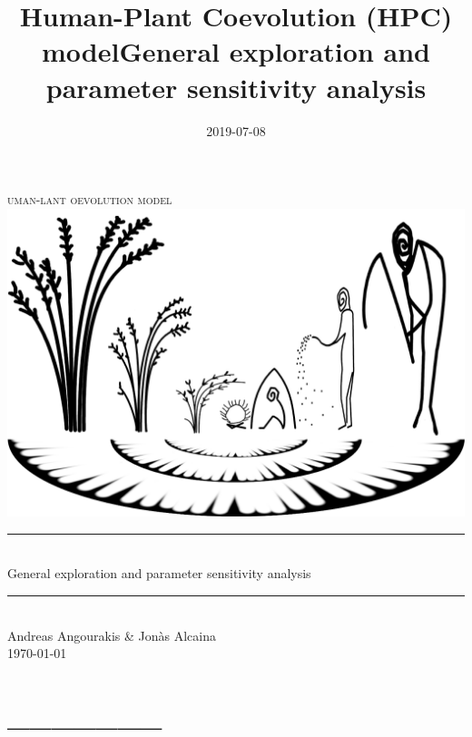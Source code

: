 \documentclass[]{book}
\title{Human-Plant Coevolution (HPC) modelGeneral exploration and parameter sensitivity analysis}
\author{}
\date{2019-07-08}
\begin{document}
\maketitle

\newcommand{\HRule}{\rule{\linewidth}{0.5mm}}


\begin{center}

\textsc{\LARGE
{}uman-lant oevolution model} 
\\[1cm]
\includegraphics[width=\textwidth]{images/hpcModel-logo_v2.png}
\\[1.5cm]
\HRule \\[0.4cm]
{ \huge General exploration and parameter sensitivity analysis \\[0.15cm] }
\HRule \\[1.5cm]
Andreas Angourakis \& Jon\`{a}s Alcaina
\\[1cm]
\today \\ [1cm]

\end{center}

\newpage
{}

{
\hypersetup{linkcolor=black}
\setcounter{tocdepth}{1}
\tableofcontents
}
\hypertarget{section}{%
\chapter*{\_\_\_\_\_\_\_}\label{section}}
\end{document}
